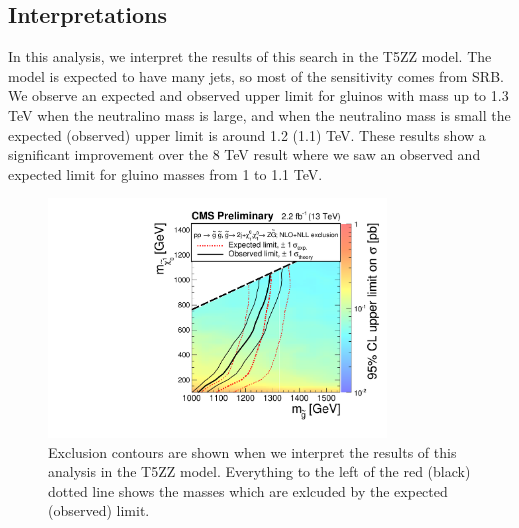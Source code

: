 \subsection{Interpretations}


In this analysis, we interpret the results of this search in the T5ZZ model.
The model is expected to have many jets, so most of the sensitivity comes from SRB.
We observe an expected and observed upper limit for gluinos with mass up to 1.3 TeV when the neutralino mass is large,
and when the neutralino mass is small the expected (observed) upper limit is around 1.2 (1.1) TeV.
These results show a significant improvement over the 8 TeV result where we saw an observed and expected limit for gluino masses from 1 to 1.1 TeV.


\begin{figure}[!htb]
\begin{center}
\includegraphics[width=0.8\textwidth]{results/figs/T5ZZ_Exclusion_13TeV.pdf}
\caption{ Exclusion contours are shown when we interpret the results of this analysis in the T5ZZ model.
  Everything to the left of the red (black) dotted line shows the masses which are exlcuded by the expected (observed) limit.
\label{fig:results_T5ZZ}}
\end{center}
\end{figure}


\clearpage
